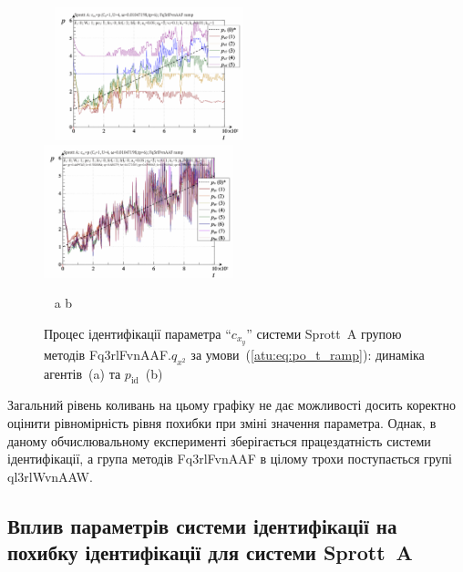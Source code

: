 \begin{figure}[htb!]
\begin{center}
  ~ \hfill
    \includegraphics[width=0.49\textwidth]{p/cha/spr_a/Fq3rlFvnAAF_x2/sprott_a_id-p_t_pi_Fq3rlFvnAAF_ramp.png}
    \hfill
    \includegraphics[width=0.49\textwidth]{p/cha/spr_a/Fq3rlFvnAAF_x2/sprott_a_id-p_t_p_Fq3rlFvnAAF_ramp.png}
  \hfill ~
\end{center}
\vspace{-1.5ex}
\begin{center}
  ~ \hfill a \hfill\hfill b \hfill ~
\end{center}
\vspace{-2.5ex}
\caption{Процес ідентифікації параметра ``$c_{x_y}$'' системи Sprott~A групою методів Fq3rlFvnAAF.$q_{x^2}$ за умови~(\ref{atu:eq:po_t_ramp}): динаміка агентів~(a) та $p_\mathrm{id}$~(b)}
  \label{atu:f:spr_a_id_Fq3rlFvnAAF_q_x2_ramp}
\end{figure}

Загальний рівень коливань на цьому графіку не дає можливості
досить коректно оцінити рівномірність рівня похибки при
зміні значення параметра. Однак, в даному обчислювальному
експерименті зберігається працездатність системи
ідентифікації, а група методів Fq3rlFvnAAF в цілому трохи
поступається групі ql3rlWvnAAW.




\subsection{Вплив параметрів системи ідентифікації на похибку ідентифікації для системи Sprott~A} %



